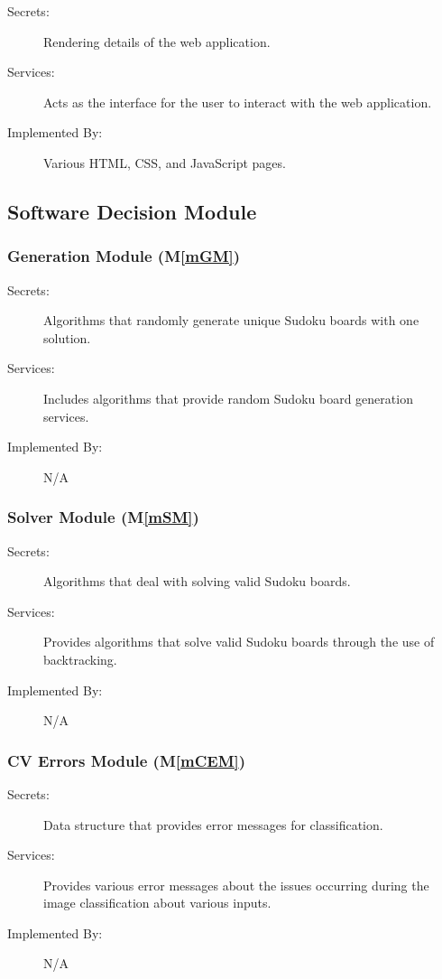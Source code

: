 \documentclass[12pt, titlepage]{article}
\newcommand{\mref}[1]{M\ref{#1}}
\begin{document}
\begin{description}
\item[Secrets:] Rendering details of the web application.
\item[Services:] Acts as the interface for the user to interact with the web application.
\item[Implemented By:] Various HTML, CSS, and JavaScript pages.
\end{description}


\subsection{Software Decision Module}

\subsubsection{Generation Module (\mref{mGM})}

\begin{description}
\item[Secrets:] Algorithms that randomly generate unique Sudoku boards with one solution.
\item[Services:] Includes algorithms that provide random Sudoku board generation services.
\item[Implemented By:] N/A
\end{description}

\subsubsection{Solver Module (\mref{mSM})}

\begin{description}
\item[Secrets:] Algorithms that deal with solving valid Sudoku boards.
\item[Services:] Provides algorithms that solve valid Sudoku boards through the use of backtracking.
\item[Implemented By:] N/A
\end{description}

\subsubsection{CV Errors Module (\mref{mCEM})}

\begin{description}
\item[Secrets:] Data structure that provides error messages for classification.
\item[Services:] Provides various error messages about the issues occurring during the image classification about various inputs.
\item[Implemented By:] N/A
\end{description}
\end{document}
